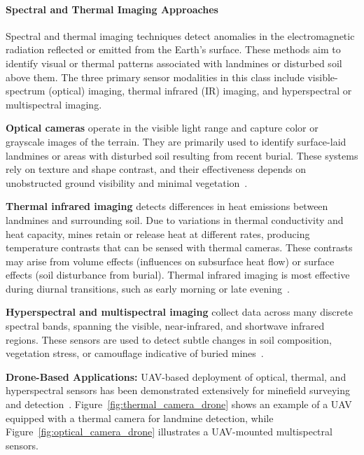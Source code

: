 \paragraph{Spectral and Thermal Imaging Approaches}

Spectral and thermal imaging techniques detect anomalies in the electromagnetic radiation reflected or emitted from the Earth's surface. These methods aim to identify visual or thermal patterns associated with landmines or disturbed soil above them. The three primary sensor modalities in this class include visible-spectrum (optical) imaging, thermal infrared (IR) imaging, and hyperspectral or multispectral imaging.

\textbf{Optical cameras} operate in the visible light range and capture color or grayscale images of the terrain. They are primarily used to identify surface-laid landmines or areas with disturbed soil resulting from recent burial. These systems rely on texture and shape contrast, and their effectiveness depends on unobstructed ground visibility and minimal vegetation~\cite{cardonalandmine}.

\textbf{Thermal infrared imaging} detects differences in heat emissions between landmines and surrounding soil. Due to variations in thermal conductivity and heat capacity, mines retain or release heat at different rates, producing temperature contrasts that can be sensed with thermal cameras. These contrasts may arise from volume effects (influences on subsurface heat flow) or surface effects (soil disturbance from burial). Thermal infrared imaging is most effective during diurnal transitions, such as early morning or late evening~\cite{Bruschini1997ASO,paik2002image,hutsul2024review}.

\textbf{Hyperspectral and multispectral imaging} collect data across many discrete spectral bands, spanning the visible, near-infrared, and shortwave infrared regions. These sensors are used to detect subtle changes in soil composition, vegetation stress, or camouflage indicative of buried mines~\cite{robledo2009survey,alqudsi2021review}.


\textbf{Drone-Based Applications:} UAV-based deployment of optical, thermal, and hyperspectral sensors has been demonstrated extensively for minefield surveying and detection~\cite{dena2020image,10.1117/12.2177182,Popov2022MethodFM,rs15040967,Baur2021HowTI,baur2020applying,AgrawalChung2024ComparingSL,10765909,6842242,rs16122046,qiu2023joint,ptsa-qj43-23,TENORIOTAMAYO2023109443,nikulin2018detection,FORERORAMIREZ2022104307,TENORIOTAMAYO2024105567,krause2018diurnal,Fardoulis2020PROOFHS,butt2024uav}. Figure~\ref{fig:thermal_camera_drone} shows an example of a UAV equipped with a thermal camera for landmine detection, while Figure~\ref{fig:optical_camera_drone} illustrates a UAV-mounted multispectral sensors. 

